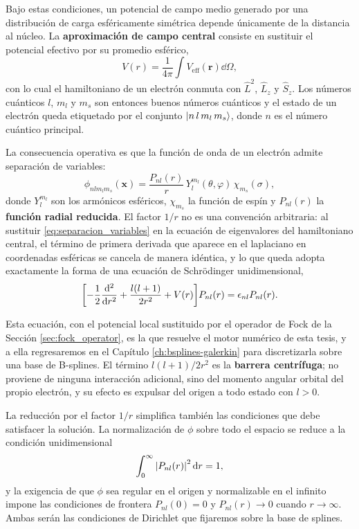 Bajo estas condiciones, un potencial de campo medio generado por una distribución de carga esféricamente simétrica depende únicamente de la distancia al núcleo. La \textbf{aproximación de campo central} consiste en sustituir el potencial efectivo por su promedio esférico,
\begin{equation}
    \label{eq:promedio_esferico}
    V(r) = \frac{1}{4\pi}\int V_{\text{eff}}(\bm{r}) \dd{\Omega},
\end{equation}
con lo cual el hamiltoniano de un electrón conmuta con $\hat{L}^2$, $\hat{L}_z$ y $\hat{S}_z$. Los números cuánticos $l$, $m_l$ y $m_s$ son entonces buenos números cuánticos y el estado de un electrón queda etiquetado por el conjunto $\ket{n\,l\,m_l\,m_s}$, donde $n$ es el número cuántico principal.

La consecuencia operativa es que la función de onda de un electrón admite separación de variables:
\begin{equation}
    \label{eq:separacion_variables}
    \phi_{nlm_lm_s}(\bm{x}) = \frac{P_{nl}(r)}{r} \, Y_{l}^{m_l}(\theta,\varphi) \, \chi_{m_s}(\sigma),
\end{equation}
donde $Y_l^{m_l}$ son los armónicos esféricos, $\chi_{m_s}$ la función de espín y $P_{nl}(r)$ la \textbf{función radial reducida}. El factor $1/r$ no es una convención arbitraria: al sustituir \eqref{eq:separacion_variables} en la ecuación de eigenvalores del hamiltoniano central, el término de primera derivada que aparece en el laplaciano en coordenadas esféricas se cancela de manera idéntica, y lo que queda adopta exactamente la forma de una ecuación de Schrödinger unidimensional,
\begin{equation}
    \label{eq:radial_schrodinger}
    \qty[ -\frac{1}{2}\dv[2]{r} + \frac{l(l+1)}{2r^2} + V(r) ] P_{nl}(r) = \epsilon_{nl} P_{nl}(r).
\end{equation}

Esta ecuación, con el potencial local sustituido por el operador de Fock de la Sección \ref{sec:fock_operator}, es la que resuelve el motor numérico de esta tesis, y a ella regresaremos en el Capítulo \ref{ch:bsplines-galerkin} para discretizarla sobre una base de B-splines. El término $l(l+1)/2r^2$ es la \textbf{barrera centrífuga}; no proviene de ninguna interacción adicional, sino del momento angular orbital del propio electrón, y su efecto es expulsar del origen a todo estado con $l>0$.

La reducción por el factor $1/r$ simplifica también las condiciones que debe satisfacer la solución. La normalización de $\phi$ sobre todo el espacio se reduce a la condición unidimensional
\begin{equation}
    \label{eq:norma_radial}
    \int_0^\infty \abs{P_{nl}(r)}^2 \dd{r} = 1,
\end{equation}
y la exigencia de que $\phi$ sea regular en el origen y normalizable en el infinito impone las condiciones de frontera $P_{nl}(0) = 0$ y $P_{nl}(r) \to 0$ cuando $r \to \infty$. Ambas serán las condiciones de Dirichlet que fijaremos sobre la base de splines.

